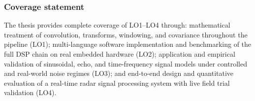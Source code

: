 \subsubsection*{Coverage statement}
The thesis provides complete coverage of LO1--LO4 through: mathematical treatment of
convolution, transforms, windowing, and covariance throughout the pipeline (LO1);
multi-language software implementation and benchmarking of the full DSP chain on real
embedded hardware (LO2); application and empirical validation of sinusoidal, echo, and
time-frequency signal models under controlled and real-world noise regimes (LO3); and
end-to-end design and quantitative evaluation of a real-time radar signal processing
system with live field trial validation (LO4).
